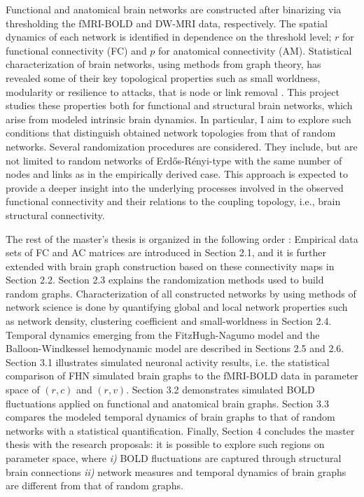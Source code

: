Functional and anatomical brain networks are constructed after binarizing via thresholding the fMRI-BOLD and DW-MRI data, respectively. The spatial dynamics of each network is identified in dependence on the threshold level; $r$ for functional connectivity (FC) and $p$ for anatomical connectivity (AM). Statistical characterization of brain networks, using methods from graph theory, has revealed some of their key topological properties such as small worldness, modularity or resilience to attacks, that is node or link removal \citep{BUL09}. This project studies these properties both for functional and structural brain networks, which arise from modeled intrinsic brain dynamics. In particular, I aim to explore such conditions that distinguish obtained network topologies from that of random networks. Several randomization procedures are considered. They include, but are not limited to random networks of Erd\H{o}s-R\'{e}nyi-type with the same number of nodes and links as in the empirically derived case. This approach is expected to provide a deeper insight into the underlying processes involved in the observed functional connectivity and their relations to the coupling topology, i.e., brain structural connectivity.


The rest of the master's thesis is organized in the following order : Empirical data sets of FC and AC matrices are introduced in Section 2.1, and it is further extended with brain graph construction based on these connectivity maps in Section 2.2. Section 2.3 explains the randomization methods used to build random graphs. Characterization of all constructed networks by using methods of network science \citep{RUB09, STA10, NEW10, RUB11} is done by quantifying global and local network properties such as network density, clustering coefficient and small-worldness in Section 2.4. Temporal dynamics emerging from the FitzHugh-Nagumo model and the Balloon-Windkessel hemodynamic model \citep{FRI00} are described in Sections 2.5 and 2.6. Section 3.1 illustrates simulated neuronal activity results, i.e. the statistical comparison of FHN simulated brain graphs to the fMRI-BOLD data in parameter space of $(r,c)$ and $(r,v)$.  Section 3.2 demonstrates simulated BOLD fluctuations applied on functional and anatomical brain graphs. Section 3.3 compares the modeled temporal dynamics of brain graphs to that of random networks with a statistical quantification. Finally, Section 4 concludes the master thesis with the research proposals: it is possible to explore such regions on parameter space, where \textit{i)} BOLD fluctuations are captured through structural brain connections \textit{ii)} network measures and temporal dynamics of brain graphs are different from that of random graphs. 
 
 

